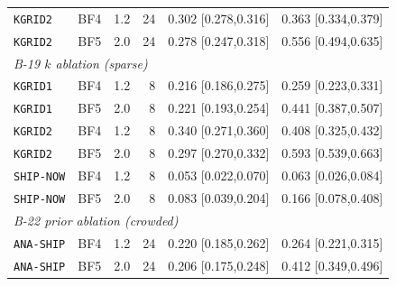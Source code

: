 \begin{table}[!htbp]
\begin{tabular}{lcrrrr}
\quad \texttt{KGRID2} & BF4 & 1.2 & 24 & 0.302 {\scriptsize[0.278,0.316]} & 0.363 {\scriptsize[0.334,0.379]} \\
\quad \texttt{KGRID2} & BF5 & 2.0 & 24 & 0.278 {\scriptsize[0.247,0.318]} & 0.556 {\scriptsize[0.494,0.635]} \\
\midrule
\multicolumn{6}{l}{\emph{B-19  $k$ ablation (sparse)}} \\
\quad \texttt{KGRID1} & BF4 & 1.2 & 8 & 0.216 {\scriptsize[0.186,0.275]} & 0.259 {\scriptsize[0.223,0.331]} \\
\quad \texttt{KGRID1} & BF5 & 2.0 & 8 & 0.221 {\scriptsize[0.193,0.254]} & 0.441 {\scriptsize[0.387,0.507]} \\
\quad \texttt{KGRID2} & BF4 & 1.2 & 8 & 0.340 {\scriptsize[0.271,0.360]} & 0.408 {\scriptsize[0.325,0.432]} \\
\quad \texttt{KGRID2} & BF5 & 2.0 & 8 & 0.297 {\scriptsize[0.270,0.332]} & 0.593 {\scriptsize[0.539,0.663]} \\
\quad \texttt{SHIP-NOW} & BF4 & 1.2 & 8 & 0.053 {\scriptsize[0.022,0.070]} & 0.063 {\scriptsize[0.026,0.084]} \\
\quad \texttt{SHIP-NOW} & BF5 & 2.0 & 8 & 0.083 {\scriptsize[0.039,0.204]} & 0.166 {\scriptsize[0.078,0.408]} \\
\midrule
\multicolumn{6}{l}{\emph{B-22  prior ablation (crowded)}} \\
\quad \texttt{ANA-SHIP} & BF4 & 1.2 & 24 & 0.220 {\scriptsize[0.185,0.262]} & 0.264 {\scriptsize[0.221,0.315]} \\
\quad \texttt{ANA-SHIP} & BF5 & 2.0 & 24 & 0.206 {\scriptsize[0.175,0.248]} & 0.412 {\scriptsize[0.349,0.496]} \\
\bottomrule
\end{tabular}
\end{table}
